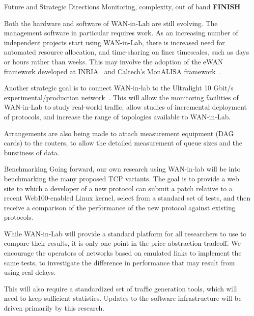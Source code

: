 \documentclass{IEEEtran}
\begin{document}
\begin{section}{Future and Strategic Directions}
Monitoring, complexity, out of band {\bf FINISH}

Both the hardware and software of WAN-in-Lab are still evolving.  The
management software in particular requires work.  As an increasing number
of independent projects start using WAN-in-Lab, there is increased need
for automated resource allocation, and time-sharing on finer timescales,
such as days or hours rather than weeks.  This may involve the adoption of
the eWAN framework developed at INRIA~\cite{eWAN} and Caltech's MonALISA
framework~\cite{MonALISA}.

Another strategic goal is to connect WAN-in-lab to the Ultralight
10 Gbit/s experimental\slash production network~\cite{UltraLight}.
This will allow the
monitoring facilities of WAN-in-Lab to study real-world traffic, allow
studies of incremental deployment of protocols, and increase the range
of topologies available to WAN-in-Lab.

Arrangements are also being made to attach measurement equipment (DAG
cards) to the routers, to allow the detailed measurement of queue sizes
and the burstiness of data.

\begin{subsection}{Benchmarking}
Going forward, our own research using WAN-in-lab will be into benchmarking
the many proposed TCP variants.  The goal is to provide a web site to
which a developer of a new protocol can submit a patch relative to a
recent Web100-enabled Linux kernel, select from a standard set of tests,
and then receive a comparison of the performance of the new protocol
against existing protocols.

While WAN-in-Lab will provide a standard platform for all researchers to use to compare their results, it is only one point in the price-abstraction tradeoff.  We encourage the operators of networks based on emulated links to implement the same tests, to investigate the difference in performance that may result from using real delays.

This will also require a standardized set of traffic generation tools,
which will need to keep sufficient statistics.  Updates to the software
infrastructure will be driven primarily by this research.
\end{subsection}

\end{section}
\end{document}
